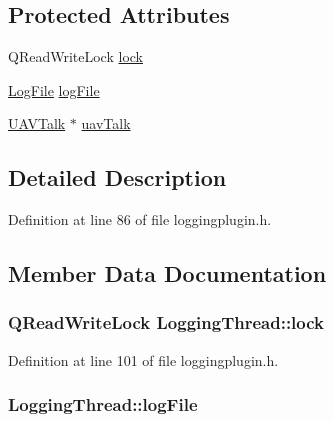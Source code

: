 \subsection*{Protected Attributes}
\begin{DoxyCompactItemize}
\item 
Q\-Read\-Write\-Lock \hyperlink{class_logging_thread_a1785d83bc4ce0953c423e8ac27d7cebb}{lock}
\item 
\hyperlink{class_log_file}{Log\-File} \hyperlink{class_logging_thread_ab940b3322d9c974b3d3630b9509ef4bb}{log\-File}
\item 
\hyperlink{class_u_a_v_talk}{U\-A\-V\-Talk} $\ast$ \hyperlink{class_logging_thread_a0dfed803383ab861a16c748421396306}{uav\-Talk}
\end{DoxyCompactItemize}


\subsection{Detailed Description}


Definition at line 86 of file loggingplugin.\-h.



\subsection{Member Data Documentation}
\hypertarget{class_logging_thread_a1785d83bc4ce0953c423e8ac27d7cebb}{
\subsubsection[{lock}]{\setlength{\rightskip}{0pt plus 5cm}Q\-Read\-Write\-Lock Logging\-Thread\-::lock\hspace{0.3cm}{\ttfamily [protected]}}}\label{class_logging_thread_a1785d83bc4ce0953c423e8ac27d7cebb}


Definition at line 101 of file loggingplugin.\-h.

\hypertarget{class_logging_thread_ab940b3322d9c974b3d3630b9509ef4bb}{
\subsubsection[{log\-File}]{ Logging\-Thread\-::log\-File\hspace{0.3cm}{\ttfamily [protected]}}}\label{class_logging_thread_ab940b3322d9c974b3d3630b9509ef4bb}


